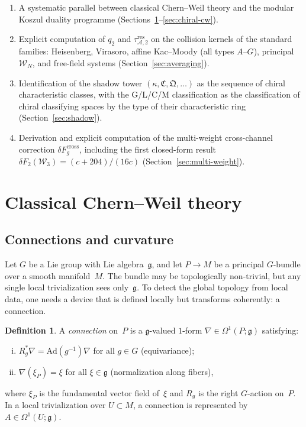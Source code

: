 \documentclass[11pt,reqno]{amsart}
\theoremstyle{definition}
\newtheorem{definition}[theorem]{Definition}
\theoremstyle{remark}
\newcommand{\cA}{\mathcal{A}}
\newcommand{\cW}{\mathcal{W}}
\newcommand{\fg}{\mathfrak{g}}
\newcommand{\Ad}{\mathrm{Ad}}
\numberwithin{equation}{section}
\begin{document}
\begin{enumerate}[(1)]
\item A systematic parallel between classical Chern--Weil theory
 and the modular Koszul duality programme
 (Sections~\ref{sec:classical}--\ref{sec:chiral-cw}).

\item Explicit computation of $q_2$ and
 $\tau_{\cA,2}^{\mathrm{res}}$ on the collision kernels of the
 standard families: Heisenberg, Virasoro,
 affine Kac--Moody (all types $A$--$G$), principal $\cW_N$,
 and free-field systems (Section~\ref{sec:averaging}).

\item Identification of the shadow tower
 $(\kappa, \mathfrak{C}, \mathfrak{Q}, \ldots)$ as the
 sequence of chiral characteristic classes, with the G/L/C/M
 classification as the classification of chiral classifying
 spaces by the type of their characteristic ring
 (Section~\ref{sec:shadow}).

\item Derivation and explicit computation of the multi-weight
 cross-channel correction $\delta F_g^{\mathrm{cross}}$,
 including the first closed-form result
 $\delta F_2(\cW_3) = (c{+}204)/(16c)$
 (Section~\ref{sec:multi-weight}).
\end{enumerate}


\section{Classical Chern--Weil theory}\label{sec:classical}

\subsection{Connections and curvature}

Let $G$ be a Lie group with Lie algebra~$\fg$, and let
$P \to M$ be a principal $G$-bundle over a smooth manifold~$M$.
The bundle may be topologically non-trivial, but any single
local trivialization sees only~$\fg$. To detect the global
topology from local data, one needs a device that is defined
locally but transforms coherently: a connection.

\begin{definition}\label{def:connection}
A \emph{connection} on~$P$ is a $\fg$-valued $1$-form
$\nabla \in \Omega^1(P;\fg)$ satisfying:
\begin{enumerate}[(i)]
\item $R_g^*\nabla = \Ad(g^{-1})\nabla$ for all $g \in G$
 (equivariance);
\item $\nabla(\xi_P) = \xi$ for all $\xi \in \fg$
 (normalization along fibers),
\end{enumerate}
where $\xi_P$ is the fundamental vector field of~$\xi$
and $R_g$ is the right $G$-action on~$P$.
In a local trivialization over $U \subset M$, a connection
is represented by $A \in \Omega^1(U;\fg)$.
\end{definition}
\end{document}
